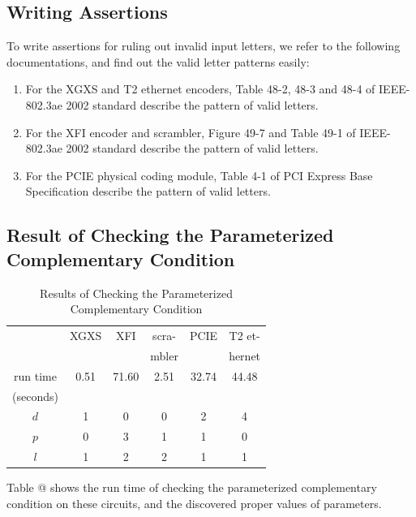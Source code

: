 \documentclass[journal]{IEEEtran}
\makeatletter
\newcommand{\Rmnum}[1]{\expandafter\@slowromancap\romannumeral #1@}
\makeatother
\begin{document}
\subsection{Writing Assertions}\label{subsec_writeass}
To write assertions for ruling out invalid input letters,
we refer to the following documentations,
and find out the valid letter patterns easily:
\begin{enumerate}
  \item For the XGXS and T2 ethernet encoders,
  Table 48-2, 48-3 and 48-4 of IEEE-802.3ae 2002 standard \cite{IEEE80232002} describe the pattern of valid letters.
  \item For the XFI encoder and scrambler,
  Figure 49-7 and Table 49-1 of IEEE-802.3ae 2002 standard \cite{IEEE80232002} describe the pattern of valid letters.
  \item For the PCIE physical coding module,
  Table 4-1 of PCI Express Base Specification \cite{PCIESPEC} describe the pattern of valid letters.
\end{enumerate}



\subsection{Result of Checking the Parameterized Complementary Condition}
\begin{table}[!t]
\centering
\caption{Results of Checking the Parameterized Complementary Condition}
\begin{tabular}{|c|c|c|c|c|c|}
\hline
&XGXS&XFI&scra-&PCIE&T2 et-\\
&&&mbler&&hernet\\ \hline
run time&0.51&71.60&2.51&32.74&44.48\\
(seconds)&&&&&\\\hline
$d$      &1       &0     &0         &2   &4          \\ \hline
$p$      &0       &3     &1         &1   &0          \\ \hline
$l$      &1       &2     &2         &1   &1          \\ \hline
\end{tabular}
\end{table}

Table \Rmnum{2} shows the run time of checking the parameterized complementary condition on these circuits,
and the discovered proper values of parameters.
\end{document}
